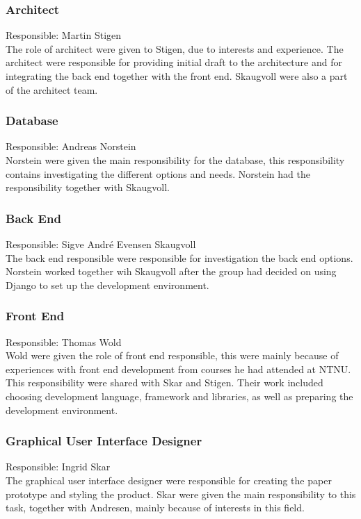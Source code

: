 \subsubsection{Architect}
Responsible: Martin Stigen \\
The role of architect were given to Stigen, due to interests and experience. The architect were responsible for providing initial draft to the architecture and for integrating the back end together with the front end. Skaugvoll were also a part of the architect team.

\subsubsection{Database}
Responsible: Andreas Norstein\\
Norstein were given the main responsibility for the database, this responsibility contains investigating the different options and needs. Norstein had the responsibility together with Skaugvoll.

\subsubsection{Back End}
Responsible: Sigve André Evensen Skaugvoll\\
The back end responsible were responsible for investigation the back end options. Norstein worked together wih Skaugvoll after the group had decided on using Django to set up the development environment.

\subsubsection{Front End}
Responsible: Thomas Wold\\
Wold were given the role of front end responsible, this were mainly because of experiences with front end development from courses he had attended at NTNU. This responsibility were shared with Skar and Stigen. Their work included choosing development language, framework and libraries, as well as preparing the development environment.

\subsubsection{Graphical User Interface Designer}
Responsible: Ingrid Skar\\
The graphical user interface designer were responsible for creating the paper prototype and styling the product. Skar were given the main responsibility to this task, together with Andresen, mainly because of interests in this field.


